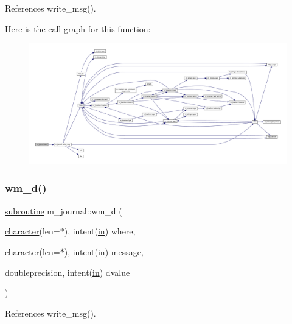References write\+\_\+msg().

Here is the call graph for this function\+:
\nopagebreak
\begin{figure}[H]
\begin{center}
\leavevmode
\includegraphics[width=350pt]{namespacem__journal_a98479e5ace98340f7519470b96d3197d_cgraph}
\end{center}
\end{figure}
\mbox{\label{namespacem__journal_ae4e688044197dd70bd47b4d7c0bb7306}} 
\subsubsection{\texorpdfstring{wm\+\_\+d()}{wm\_d()}}
{\footnotesize\ttfamily \hyperlink{M__stopwatch_83_8txt_acfbcff50169d691ff02d4a123ed70482}{subroutine} m\+\_\+journal\+::wm\+\_\+d (\begin{DoxyParamCaption}\item[{\hyperlink{option__stopwatch_83_8txt_abd4b21fbbd175834027b5224bfe97e66}{character}(len=$\ast$), intent(\hyperlink{M__journal_83_8txt_afce72651d1eed785a2132bee863b2f38}{in})}]{where,  }\item[{\hyperlink{option__stopwatch_83_8txt_abd4b21fbbd175834027b5224bfe97e66}{character}(len=$\ast$), intent(\hyperlink{M__journal_83_8txt_afce72651d1eed785a2132bee863b2f38}{in})}]{message,  }\item[{doubleprecision, intent(\hyperlink{M__journal_83_8txt_afce72651d1eed785a2132bee863b2f38}{in})}]{dvalue }\end{DoxyParamCaption})\hspace{0.3cm}{\ttfamily [private]}}



References write\+\_\+msg().

